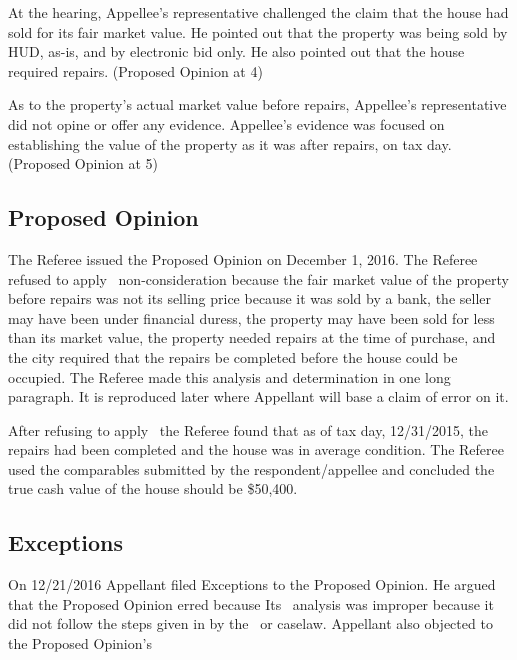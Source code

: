 \documentclass[12pt,\documentclassflag]{michiganCourtOfAppealsBrief}
\def\mathieuGast{\pincite[l]{MCL}{211.27(2)}}
\begin{document}
At the hearing, Appellee's representative challenged the claim that the house had sold for its fair market value. He pointed out that the property was being sold by HUD, as-is, and by electronic bid only. He also pointed out that the house required repairs. (Proposed Opinion at 4)

As to the property's actual market value before repairs, Appellee's representative did not opine or offer any evidence. Appellee's evidence was focused on establishing the value of the property as it was after repairs, on tax day. (Proposed Opinion at 5)

\subsection{Proposed Opinion}

The Referee issued the Proposed Opinion on December 1, 2016. The Referee refused to apply \mathieuGast\ non-consideration because the fair market value of the property before repairs was not its selling price because it  was sold by a bank, the seller may have been under financial duress, the property may have been sold for less than its market value, the property needed repairs at the time of purchase, and the city required that the repairs be completed before the house could be occupied. The Referee made this analysis and determination in one long paragraph. It is reproduced later where Appellant will base a claim of error on it.


After refusing to apply \mathieuGast\ the Referee found that as of tax day, 12/31/2015, the repairs had been completed and the house was in average condition. The Referee used the comparables submitted by the respondent/appellee and concluded the true cash value of the house should be \$50,400. 

\subsection{Exceptions}

On 12/21/2016 Appellant filed Exceptions to the Proposed Opinion. He argued that the Proposed Opinion erred because Its \mathieuGast\ analysis was improper because it did not follow the steps given in by the \STC\ or caselaw. Appellant also objected to the Proposed Opinion's 
\end{document}
